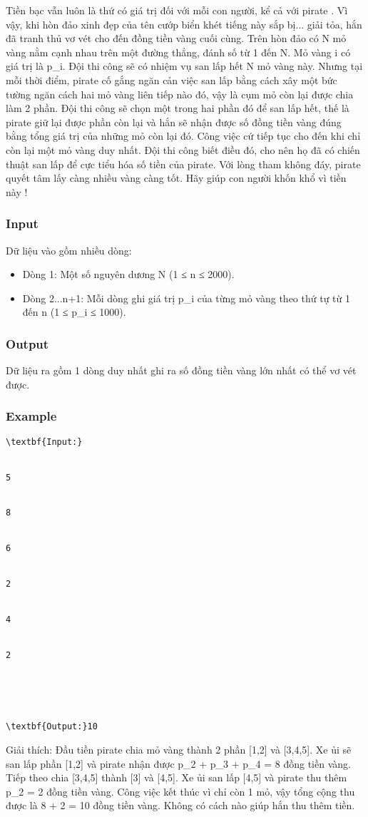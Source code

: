 



   Tiền bạc vẫn luôn là thứ có giá trị đối với mỗi con người, kể cả với   pirate   . Vì vậy, khi hòn đảo xinh đẹp của tên cướp biển khét tiếng này sắp bị... giải tỏa, hắn đã tranh thủ vơ vét cho đến đồng tiền vàng cuối cùng. Trên hòn đảo có N mỏ vàng nằm cạnh nhau trên một đường thẳng, đánh số từ 1 đến N. Mỏ vàng i có giá trị là p\_i. Đội thi công sẽ có nhiệm vụ san lấp hết N mỏ vàng này. Nhưng tại mỗi thời điểm,   pirate   cố gắng ngăn cản việc san lấp bằng cách xây một bức tường ngăn cách hai mỏ vàng liên tiếp nào đó, vậy là cụm mỏ còn lại được chia làm 2 phần. Đội thi công sẽ chọn một trong hai phần đó để san lấp hết, thế là   pirate   giữ lại được phần còn lại và hắn sẽ nhận được số đồng tiền vàng đúng bằng tổng giá trị của những mỏ còn lại đó. Công việc cứ tiếp tục cho đến khi chỉ còn lại một mỏ vàng duy nhất. Đội thi công biết điều đó, cho nên họ đã có chiến thuật san lấp để cực tiểu hóa số tiền của pirate. Với lòng tham không đáy, pirate quyết tâm lấy càng nhiều vàng càng tốt. Hãy giúp con người khốn khổ vì tiền này !  

\subsubsection{   Input  }

   Dữ liệu vào gồm nhiều dòng:  
\begin{itemize}
	\item     Dòng 1: Một số nguyên dương N (1 ≤ n ≤ 2000).   
	\item     Dòng 2...n+1: Mỗi dòng ghi giá trị p\_i của từng mỏ vàng theo thứ tự từ 1 đến n (1 ≤ p\_i ≤ 1000).   
\end{itemize}

\subsubsection{   Output  }

   Dữ liệu ra gồm 1 dòng duy nhất ghi ra số đồng tiền vàng lớn nhất có thể vơ vét được.  

\subsubsection{   Example  }
\begin{verbatim}
\textbf{Input:}


5


8


6


2


4


2





\textbf{Output:}10
\end{verbatim}

   Giải thích: Đầu tiền pirate chia mỏ vàng thành 2 phần [1,2] và [3,4,5]. Xe ủi sẽ san lấp phần [1,2] và pirate nhận được p\_2 + p\_3 + p\_4 =  8 đồng tiền vàng. Tiếp theo chia [3,4,5] thành [3] và [4,5]. Xe ủi san lấp [4,5] và pirate thu thêm p\_2 = 2 đồng tiền vàng. Công việc kết thúc vì chỉ còn 1 mỏ, vậy tổng cộng thu được là 8 + 2 = 10 đồng tiền vàng. Không có cách nào giúp hắn thu thêm tiền.  
